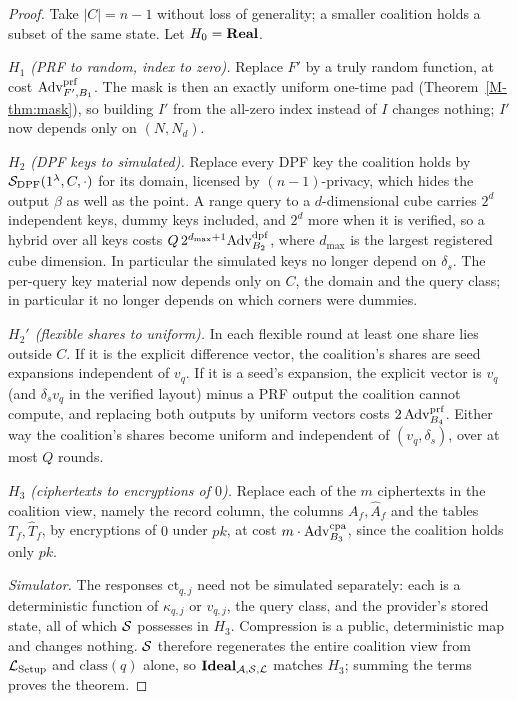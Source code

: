 \documentclass[11pt,a4paper]{article}
\newcommand{\mref}[1]{\ref{M-#1}}
\begin{document}
\begin{proof}
Take $|C|=n-1$ without loss of generality; a smaller coalition holds a subset
of the same state. Let $H_0=\mathbf{Real}$.

\emph{$H_1$ (PRF to random, index to zero).} Replace $F'$ by a truly random
function, at cost $\mathrm{Adv}^{\mathrm{prf}}_{F',B_1}$. The mask is then an
exactly uniform one-time pad (Theorem~\mref{thm:mask}), so building $I'$ from
the all-zero index instead of $I$ changes nothing; $I'$ now depends only on
$(N,N_d)$.

\emph{$H_2$ (DPF keys to simulated).} Replace every DPF key the coalition
holds by $\mathcal{S}_{\mathrm{DPF}}(1^\lambda,C,\cdot)$ for its domain, licensed by
$(n{-}1)$-privacy, which hides the output $\beta$ as well as the point. A range
query to a $d$-dimensional cube carries $2^d$ independent keys, dummy keys
included, and $2^d$ more when it is verified, so a hybrid over all keys costs
$Q\,2^{d_{\max}+1}\mathrm{Adv}^{\mathrm{dpf}}_{B_2}$, where $d_{\max}$ is the
largest registered cube dimension. In particular the simulated keys no longer
depend on $\delta_s$. The per-query key material now depends only
on $C$, the domain and the query class; in particular it no longer depends on
which corners were dummies.

\emph{$H_2'$ (flexible shares to uniform).} In each flexible round at least one
share lies outside $C$. If it is the explicit difference vector, the
coalition's shares are seed expansions independent of $v_q$. If it is a seed's
expansion, the explicit vector is $v_q$ (and $\delta_s v_q$ in the verified
layout) minus a PRF output the coalition cannot
compute, and replacing both outputs by uniform vectors costs
$2\,\mathrm{Adv}^{\mathrm{prf}}_{B_4}$. Either way the coalition's shares become
uniform and independent of $(v_q,\delta_s)$, over at most $Q$ rounds.

\emph{$H_3$ (ciphertexts to encryptions of $0$).} Replace each of the $m$
ciphertexts in the coalition view, namely the record column, the columns
$A_f,\widehat A_f$ and the tables $T_f,\widehat T_f$, by encryptions of $0$
under $pk$,
at cost $m\cdot\mathrm{Adv}^{\mathrm{cpa}}_{B_3}$, since the coalition holds
only $pk$.

\emph{Simulator.} The responses $\text{ct}_{q,j}$ need not be simulated
separately: each is a deterministic function of $\kappa_{q,j}$ or $v_{q,j}$,
the query class, and the provider's stored state, all of which $\mathcal{S}$
possesses in $H_3$. Compression is a public, deterministic map and changes
nothing. $\mathcal{S}$ therefore regenerates the entire coalition view from
$\mathcal{L}_{\mathrm{Setup}}$ and $\mathrm{class}(q)$ alone, so
$\mathbf{Ideal}_{\mathcal{A},\mathcal{S},\mathcal{L}}$ matches $H_3$; summing the terms proves the
theorem. 
\end{proof}
\end{document}
